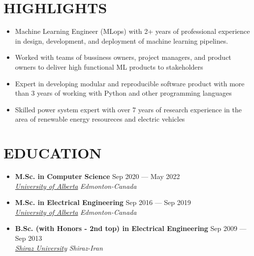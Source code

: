 \documentclass[11pt,a4paper,sans]{moderncv} %
\begin{document}
	
	\makecvtitle
	
\vspace{-1cm}
    \section{HIGHLIGHTS}
    \begin{itemize}
    	\item Machine Learning Engineer (MLops) with 2+ years of professional experience in design, development, and deployment of machine learning pipelines.
    	\item Worked with teams of bussiness owners, project managers, and product owners to deliver high functional ML products to stakeholders
    	\item Expert in developing modular and reproducible software product with more than 3 years of working with Python and other programming languages
    	\item Skilled power system expert with over 7 years of research experience in the area of renewable energy resoureces and electric vehicles
    \end{itemize}
	
	\section{EDUCATION}

	\begin{itemize}
		\item \textbf{M.Sc. in Computer Science} \hfill Sep 2020 --- May 2022 \\ 
		\href{https://ualberta.ca/}{ \emph{University of Alberta}} \hfill \emph{Edmonton-Canada}
		
		\item \textbf{M.Sc. in Electrical Engineering} \hfill Sep 2016 --- Sep 2019 \\ 
		\href{https://ualberta.ca/}{ \emph{University of Alberta}} \hfill \emph{Edmonton-Canada}
		
		\item \textbf{B.Sc. (with Honors - 2nd top) in Electrical Engineering} \hfill Sep 2009 --- Sep 2013 \\ 
		\href{https://ualberta.ca/}{ \emph{Shiraz University}} \hfill \emph{Shiraz-Iran}

	\end{itemize}
	
\end{document}
